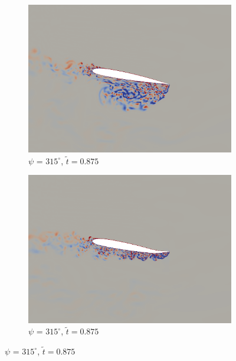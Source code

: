 \begin{figure}[H]
	\begin{subfigure}[b]{0.4\textwidth}
		\centering
		\includegraphics[width=1\textwidth]{figures/SC1095/baseline/phase_315.png}
		\caption{ $\psi$ = $315^\circ$, $\tilde{t}=0.875$}
		\label{fig:SC1095_baseline_psi315}
	\end{subfigure}
	\begin{subfigure}[b]{0.4\textwidth}
		\centering
		\includegraphics[width=1\textwidth]{figures/SC1095/AC/phase_315.png}
		\caption{ $\psi$ = $315^\circ$, $\tilde{t}=0.875$}
		\label{fig:SC1095_AC_psi315}
	\end{subfigure}
	
	

\end{figure}
